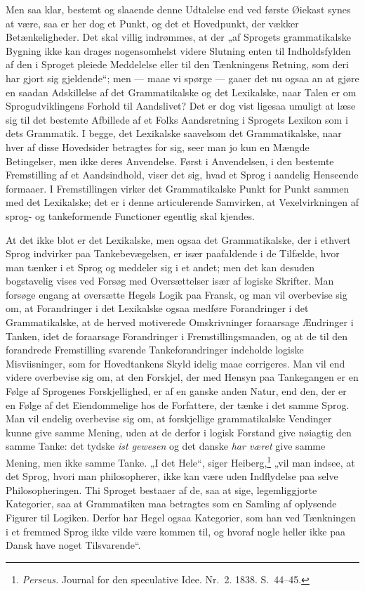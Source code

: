 \documentclass[12pt]{book}
\newcommand{\opage}[1]{\marginnote{\footnotesize\textit{[#1]}}}
\begin{document}
\opage{46}Men saa klar, bestemt og slaaende denne Udtalelse end ved første Øiekast synes at være, saa er her dog et Punkt, og det et Hovedpunkt, der vækker Betænkeligheder. Det skal villig indrømmes, at der „af Sprogets grammatikalske Bygning ikke kan drages nogensomhelst videre Slutning enten til Indholdsfylden af den i Sproget pleiede Meddelelse eller til den Tænkningens Retning, som deri har gjort sig gjeldende“;
men --- maae vi spørge --- gaaer det nu ogsaa an at gjøre en saadan Adskillelse af det Grammatikalske og det Lexikalske, naar Talen er om Sprogudviklingens Forhold til Aandslivet? Det er dog vist ligesaa umuligt at læse sig til det bestemte Afbillede af et Folks Aandsretning i Sprogets Lexikon som i dets Grammatik. I begge, det Lexikalske saavelsom det Grammatikalske, naar hver af disse Hovedsider betragtes for sig, seer man jo kun en Mængde Betingelser, men ikke deres Anvendelse. Først i Anvendelsen, i den bestemte Fremstilling af et Aandsindhold, viser det sig, hvad et Sprog i aandelig Henseende formaaer. I Fremstillingen virker det Grammatikalske Punkt for Punkt sammen med det Lexikalske; det er i denne articulerende Samvirken, at Vexelvirkningen af sprog- og tankeformende Functioner egentlig skal kjendes.

At det ikke blot er det Lexikalske, men ogsaa det Grammatikalske, der i ethvert Sprog indvirker paa Tankebevægelsen, er især paafaldende i de Tilfælde, hvor man tænker i et Sprog og meddeler sig i et andet; men det kan desuden bogstavelig vises ved Forsøg med Oversættelser især af logiske Skrifter. Man forsøge engang at oversætte Hegels Logik paa Fransk, og man vil overbevise sig om, at Forandringer i det Lexikalske ogsaa medføre Forandringer i det Grammatikalske, at de herved motiverede Omskrivninger foraarsage Ændringer i Tanken, idet de foraarsage Forandringer i Fremstillingsmaaden, og at de til den forandrede Fremstilling svarende Tankeforandringer indeholde logiske Misviisninger, som for Hovedtankens Skyld idelig maae corrigeres. Man vil end%
\opage{47}videre overbevise sig om, at den Forskjel, der med Hensyn paa Tankegangen er en Følge af Sprogenes Forskjellighed, er af en ganske anden Natur, end den, der er en Følge af det Eiendommelige hos de Forfattere, der tænke i det samme Sprog. Man vil endelig overbevise sig om, at forskjellige grammatikalske Vendinger kunne give samme Mening, uden at de derfor i logisk Forstand give nøiagtig den samme Tanke: det tydske \emph{ist gewesen} og det danske \emph{har været} give samme Mening, men ikke samme Tanke. „I det Hele“, siger Heiberg,\footnote{\emph{Perseus.} Journal for den speculative Idee. Nr.~2. 1838. S.~44--45.}%
{} „vil man indsee, at det Sprog, hvori man philosopherer, ikke kan være uden Indflydelse paa selve Philosopheringen. Thi Sproget bestaaer af de, saa at sige, legemliggjorte Kategorier, saa at Grammatiken maa betragtes som en Samling af oplysende Figurer til Logiken.
Derfor har Hegel ogsaa Kategorier, som han ved Tænkningen i et fremmed Sprog ikke vilde være kommen til, og hvoraf nogle heller ikke paa Dansk have noget Tilsvarende“.
\end{document}
